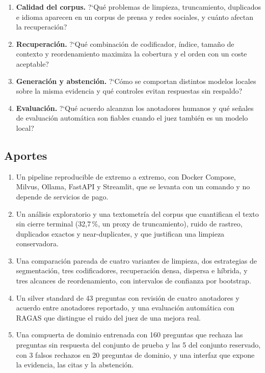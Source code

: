 \begin{enumerate}
\item \textbf{Calidad del corpus.} ?`Qu\'e problemas de limpieza, truncamiento, duplicados e idioma aparecen en un corpus de prensa y redes sociales, y cu\'anto afectan la recuperaci\'on?
\item \textbf{Recuperaci\'on.} ?`Qu\'e combinaci\'on de codificador, \'indice, tama\~no de contexto y reordenamiento maximiza la cobertura y el orden con un coste aceptable?
\item \textbf{Generaci\'on y abstenci\'on.} ?`C\'omo se comportan distintos modelos locales sobre la misma evidencia y qu\'e controles evitan respuestas sin respaldo?
\item \textbf{Evaluaci\'on.} ?`Qu\'e acuerdo alcanzan los anotadores humanos y qu\'e se\~nales de evaluaci\'on autom\'atica son fiables cuando el juez tambi\'en es un modelo local?
\end{enumerate}

\subsection{Aportes}

\begin{enumerate}
\item Un pipeline reproducible de extremo a extremo, con Docker Compose, Milvus, Ollama, FastAPI y Streamlit, que se levanta con un comando y no depende de servicios de pago.
\item Un an\'alisis exploratorio y una textometr\'ia del corpus que cuantifican el texto sin cierre terminal (32,7\,\%, un proxy de truncamiento), ruido de rastreo, duplicados exactos y near-duplicates, y que justifican una limpieza conservadora.
\item Una comparaci\'on pareada de cuatro variantes de limpieza, dos estrategias de segmentaci\'on, tres codificadores, recuperaci\'on densa, dispersa e h\'ibrida, y tres alcances de reordenamiento, con intervalos de confianza por bootstrap.
\item Un silver standard de 43 preguntas con revisi\'on de cuatro anotadores y acuerdo entre anotadores reportado, y una evaluaci\'on autom\'atica con RAGAS que distingue el ruido del juez de una mejora real.
\item Una compuerta de dominio entrenada con 160 preguntas que rechaza las preguntas sin respuesta del conjunto de prueba y las 5 del conjunto reservado, con 3 falsos rechazos en 20 preguntas de dominio, y una interfaz que expone la evidencia, las citas y la abstenci\'on.
\end{enumerate}

